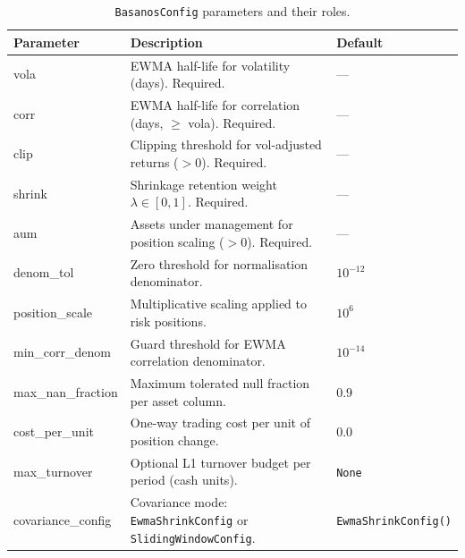 \documentclass[11pt,a4paper]{article}
\begin{document}
\begin{table}[h]
  \centering
  \caption{\texttt{BasanosConfig} parameters and their roles.}
  \label{tab:config}
  \begin{tabular}{>{\ttfamily}lp{6cm}l}
    \toprule
    \normalfont\textbf{Parameter} & \textbf{Description} & \textbf{Default} \\
    \midrule
    vola   & EWMA half-life for volatility (days). Required. & --- \\
    corr   & EWMA half-life for correlation (days, $\geq$ vola). Required. & --- \\
    clip   & Clipping threshold for vol-adjusted returns ($> 0$). Required. & --- \\
    shrink & Shrinkage retention weight $\lambda \in [0,1]$. Required. & --- \\
    aum    & Assets under management for position scaling ($> 0$). Required. & --- \\
    denom\_tol & Zero threshold for normalisation denominator. & $10^{-12}$ \\
    position\_scale & Multiplicative scaling applied to risk positions. & $10^6$ \\
    min\_corr\_denom & Guard threshold for EWMA correlation denominator. & $10^{-14}$ \\
    max\_nan\_fraction & Maximum tolerated null fraction per asset column. & $0.9$ \\
    cost\_per\_unit & One-way trading cost per unit of position change. & $0.0$ \\
    max\_turnover & Optional L1 turnover budget per period (cash units). & \texttt{None} \\
    covariance\_config & Covariance mode: \texttt{EwmaShrinkConfig} or \texttt{SlidingWindowConfig}. & \texttt{EwmaShrinkConfig()} \\
    \bottomrule
  \end{tabular}
\end{table}



\end{document}
